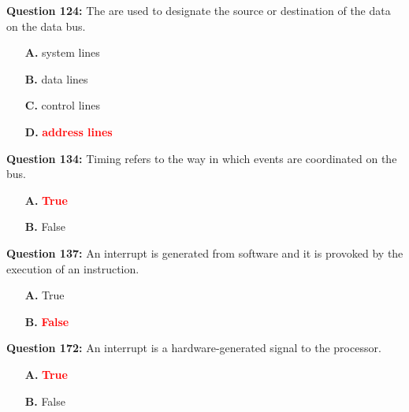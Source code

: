 \documentclass[12pt,a4paper]{article}
\begin{document}
\vspace{0.5cm}

\textbf{Question 124:} The \underline{\hspace{1.5cm}} are used to designate the source or destination of the data on the data bus.

\begin{itemize}
    \item[\textbf{A.}] system lines
    \item[\textbf{B.}] data lines
    \item[\textbf{C.}] control lines
    \item[\textbf{D.}] \textcolor{red}{\textbf{address lines}}
\end{itemize}

\vspace{0.5cm}

\vspace{0.5cm}

\textbf{Question 134:} Timing refers to the way in which events are coordinated on the bus.

\begin{itemize}
    \item[\textbf{A.}] \textcolor{red}{\textbf{True}}
    \item[\textbf{B.}] False
\end{itemize}

\vspace{0.5cm}

\vspace{0.5cm}

\textbf{Question 137:} An interrupt is generated from software and it is provoked by the execution of an instruction.

\begin{itemize}
    \item[\textbf{A.}] True
    \item[\textbf{B.}] \textcolor{red}{\textbf{False}}
\end{itemize}

\vspace{0.5cm}

\vspace{0.5cm}

\textbf{Question 172:} An interrupt is a hardware-generated signal to the processor.

\begin{itemize}
    \item[\textbf{A.}] \textcolor{red}{\textbf{True}}
    \item[\textbf{B.}] False
\end{itemize}
\end{document}
